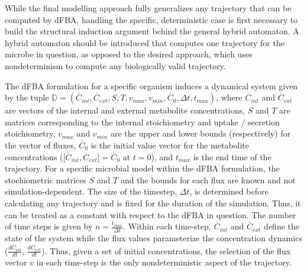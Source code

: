 
While the final modelling approach fully generalizes any trajectory that can be computed by dFBA, handling the specific, deterministic case is first necessary to build the structural induction argument behind the general hybrid automaton. A hybrid automaton should be introduced that computes one trajectory for the microbe in question, as opposed to the desired approach, which uses nondeterminism to compute any biologically valid trajectory.


The dFBA formulation for a specific organism induces a dynamical system given by the tuple $\mathbb{D} = (\overline{C}_{int}, \overline{C}_{ext}, S, T, v_{max}, v_{min}, \overline{C}_{0}, \Delta t, t_{max})$, where $\overline{C}_{int}$ and $\overline{C}_{ext}$ are vectors of the internal and external metabolite concentrations, $S$ and $T$ are matrices corresponding to the internal stoichiometry and uptake / secretion stoichiometry, $v_{max}$ and $v_{min}$ are the upper and lower bounds (respectively) for the vector of fluxes, $\overline{C}_{0}$ is the initial value vector for the metabolite concentrations ([$\overline{C}_{int}, \overline{C}_{ext}] = \overline{C}_{0}$ at $t = 0$), and $t_{max}$ is the end time of the trajectory. For a specific microbial model within the dFBA formulation, the stochiometric matrices $S$ and $T$ and the bounds for each flux are known and not simulation-dependent. The size of the timestep, $\Delta t$, is determined before calculating any trajectory and is fixed for the duration of the simulation. Thus, it can be treated as a constant with respect to the dFBA in question. The number of time steps is given by $n = \frac{t_{max}}{\Delta t}$. Within each time-step, $\overline{C}_{int}$ and $\overline{C}_{ext}$ define the state of the system while the flux values parameterize the concentration dynamics ($\frac{d\overline{C}_{int}}{dt}$, $\frac{d\overline{C}_{ext}}{dt}$). Thus, given a set of initial concentrations, the selection of the flux vector $v$ in each time-step is the only nondeterministic aspect of the trajectory.

